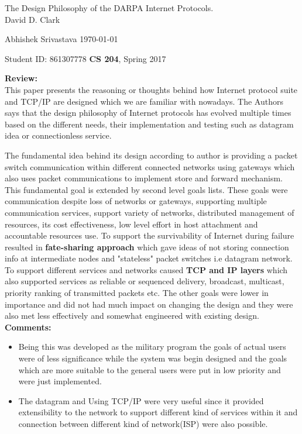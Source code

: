 \documentclass[a4paper,12pt, twoside]{article}
\renewcommand{\maketitle}{%
 	\Large
 	\begin{center}
 	The Design Philosophy of the DARPA Internet Protocols.\\	
 	\normalsize David D. Clark
 	\end{center}
 
 	\Large
	Abhishek Srivastava
	\hfill
	\normalsize
	\today
 	\par
 	Student ID: 861307778
 	\hfill
 	\textbf{CS 204}, Spring 2017
 	\par 	
 	\hrulefill
 	\par
 	}
\begin{document}
\thispagestyle{empty}
	
\maketitle

\textbf{Review:}\\
This paper presents the reasoning or thoughts behind how Internet protocol suite and TCP/IP are designed which we are familiar with nowadays. The Authors says that the design philosophy of Internet protocols has evolved multiple times based on the different needs, their implementation and testing such as datagram idea or connectionless service.

The fundamental idea behind its design according to author is providing a packet switch communication within different connected networks using gateways which also uses packet communications to implement store and forward mechanism. This fundamental goal is extended by second level goals lists. These goals were communication despite loss of networks or gateways, supporting multiple communication services, support variety of networks, distributed management of resources, its cost effectiveness, low level effort in host attachment and accountable resources use. To support the survivability of Internet during failure resulted in \textbf{fate-sharing approach} which gave ideas of not storing connection info at intermediate nodes and "stateless" packet switches i.e datagram network. To support different services and networks caused \textbf{TCP and IP layers} which also supported services as reliable or sequenced delivery, broadcast, multicast, priority ranking of transmitted packets etc. The other goals were lower in importance and did not had much impact on changing the design and they were also met less effectively and somewhat engineered with existing design. \\ 


\textbf{Comments:}
\begin{itemize}
	\item Being this was developed as the military program the goals of actual users were of less significance while the system was begin designed and the goals which are more suitable to the general users were put in low priority and were just implemented. 
	\item The datagram and Using TCP/IP were very useful since it provided extensibility to the network to support different kind of services within it and connection between different kind of network(ISP) were also possible.
\end{itemize}
\end{document}
